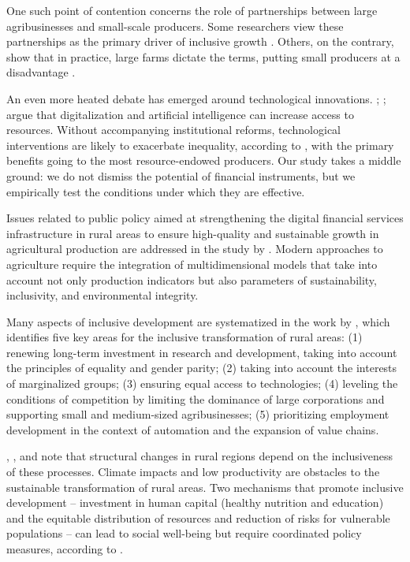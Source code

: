\documentclass[pdflatex,sn-mathphys-ay]{sn-jnl}
\begin{document}
One such point of contention concerns the role of partnerships between
large agribusinesses and small-scale producers. Some researchers view
these partnerships as the primary driver of inclusive growth
\citep{ref34,ref90}. Others, on the
contrary, show that in practice, large farms dictate the terms, putting
small producers at a disadvantage \citep{ref90}.

An even more heated debate has emerged around technological innovations.
\citet{ref105}; \citet{ref72}; \citep{ref43,ref37,ref104} argue that digitalization and
artificial intelligence can increase access to resources. Without
accompanying institutional reforms, technological interventions are
likely to exacerbate inequality, according to \citet{ref28},
with the primary benefits going to the most resource-endowed producers.
Our study takes a middle ground: we do not dismiss the potential of
financial instruments, but we empirically test the conditions under
which they are effective.

Issues related to public policy aimed at strengthening the digital
financial services infrastructure in rural areas to ensure high-quality
and sustainable growth in agricultural production are addressed in the
study by \citet{ref38}. Modern approaches to agriculture
require the integration of multidimensional models that take into
account not only production indicators but also parameters of
sustainability, inclusivity, and environmental integrity.

Many aspects of inclusive development are systematized in the work
by \citet{ref55}, which identifies five key areas for the
inclusive transformation of rural areas: (1) renewing long-term
investment in research and development, taking into account the
principles of equality and gender parity; (2) taking into account the
interests of marginalized groups; (3) ensuring equal access to
technologies; (4) leveling the conditions of competition by limiting the
dominance of large corporations and supporting small and medium-sized
agribusinesses; (5) prioritizing employment development in the context
of automation and the expansion of value chains.

\citet{ref47}, \citet{ref64}, and \citet{ref96} note that structural changes in rural
regions depend on the inclusiveness of these processes. Climate impacts
and low productivity are obstacles to the sustainable transformation of
rural areas. Two mechanisms that promote inclusive development --
investment in human capital (healthy nutrition and education) and the
equitable distribution of resources and reduction of risks for
vulnerable populations -- can lead to social well-being but require
coordinated policy measures, according to \citet{ref21}.
\end{document}
